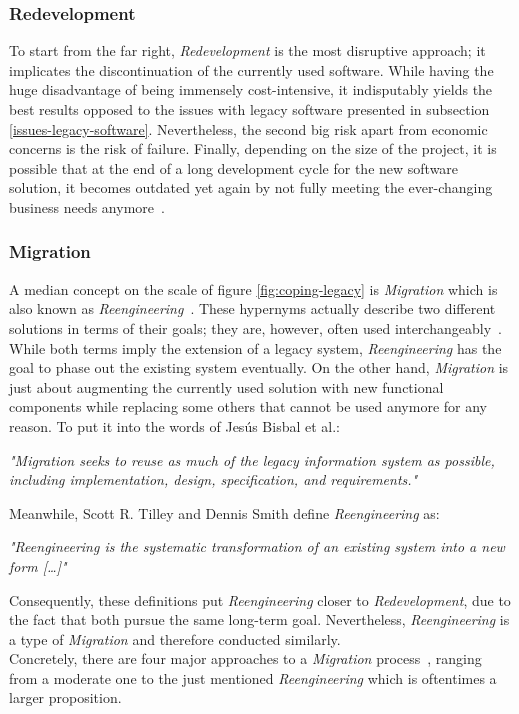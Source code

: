 \documentclass[12pt,a4paper,twoside]{report}
\begin{document}
\subsubsection{Redevelopment}

To start from the far right, \textit{Redevelopment} is the most disruptive approach;
it implicates the discontinuation of the currently used software.
While having the huge disadvantage of being immensely cost-intensive, it indisputably
yields the best results opposed to the issues with legacy software presented in
subsection \ref{issues-legacy-software}.
Nevertheless, the second big risk apart from economic concerns is
the risk of failure.
Finally, depending on the size of the project, it is possible that at the end
of a long development cycle for the new software solution, it becomes outdated
yet again by not fully meeting the ever-changing
business needs anymore~\cite{stevens-software-reengineering-patterns}.


\subsubsection{Migration}

A median concept on the scale of figure \ref{fig:coping-legacy} is \textit{Migration}
which is also known as \textit{Reengineering}~\cite{tilley-perspectives-reengineering}.
These hypernyms actually describe two different solutions in terms of their goals;
they are, however, often used interchangeably~\cite{bisbal-legacy-issues}.
While both terms imply the extension of a legacy system, \textit{Reengineering}
has the goal to phase out the existing system eventually.
On the other hand, \textit{Migration} is just about augmenting the currently used
solution with new functional components while replacing some others that cannot be used anymore
for any reason. To put it into the words of Jesús Bisbal et al.:
\begin{displayquote}
\emph{"Migration seeks to reuse as much of the legacy information system as possible,
including implementation, design, specification, and requirements."}~\cite{bisbal-legacy-issues}
\end{displayquote}
Meanwhile, Scott R. Tilley and Dennis Smith define \textit{Reengineering} as:
\begin{displayquote}
\emph{"Reengineering is the systematic transformation of an existing system
into a new form […]"}~\cite{tilley-perspectives-reengineering}
\end{displayquote}
Consequently, these definitions put \textit{Reengineering} closer to \textit{Redevelopment},
due to the fact that both pursue the same long-term goal.
Nevertheless, \textit{Reengineering} is a type of \textit{Migration} and
therefore conducted similarly.\\
Concretely, there are four major approaches to a \textit{Migration}
process~\cite{malinova-legacy-techniques, seacord-modernizing-legacy},
ranging from a moderate one to the just mentioned \textit{Reengineering}
which is oftentimes a larger proposition.
\end{document}
